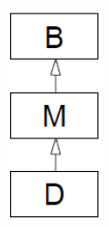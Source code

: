 \begin{minipage}{0.05\linewidth}
  \includegraphics[width=\linewidth]{images/AdvancedCPP/BMD}
\end{minipage}\\

